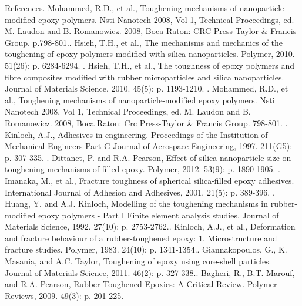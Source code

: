 \documentclass[numbers=noendperiod,chapterprefix=on]{icldt} %
\begin{document}

References.	Mohammed, R.D., et al., Toughening mechanisms of nanoparticle-modified epoxy polymers. Nsti Nanotech 2008, Vol 1, Technical Proceedings, ed. M. Laudon and B. Romanowicz. 2008, Boca Raton: CRC Press-Taylor \& Francis Group. p.798-801..	Hsieh, T.H., et al., The mechanisms and mechanics of the toughening of epoxy polymers modified with silica nanoparticles. Polymer, 2010. 51(26): p. 6284-6294.
.	Hsieh, T.H., et al., The toughness of epoxy polymers and fibre composites modified with rubber microparticles and silica nanoparticles. Journal of Materials Science, 2010. 45(5): p. 1193-1210.
.	Mohammed, R.D., et al., Toughening mechanisms of nanoparticle-modified epoxy polymers. Nsti Nanotech 2008, Vol 1, Technical Proceedings, ed. M. Laudon and B. Romanowicz. 2008, Boca Raton: Crc Press-Taylor \& Francis Group. 798-801.
.	Kinloch, A.J., Adhesives in engineering. Proceedings of the Institution of Mechanical Engineers Part G-Journal of Aerospace Engineering, 1997. 211(G5): p. 307-335.
.	Dittanet, P. and R.A. Pearson, Effect of silica nanoparticle size on toughening mechanisms of filled epoxy. Polymer, 2012. 53(9): p. 1890-1905.
.	Imanaka, M., et al., Fracture toughness of spherical silica-filled epoxy adhesives. International Journal of Adhesion and Adhesives, 2001. 21(5): p. 389-396.
.	Huang, Y. and A.J. Kinloch, Modelling of the toughening mechanisms in rubber-modified epoxy polymers - Part I Finite element analysis studies. Journal of Materials Science, 1992. 27(10): p. 2753-2762..	Kinloch, A.J., et al., Deformation and fracture behaviour of a rubber-toughened epoxy: 1. Microstructure and fracture studies. Polymer, 1983. 24(10): p. 1341-1354..	Giannakopoulos, G., K. Masania, and A.C. Taylor, Toughening of epoxy using core-shell particles. Journal of Materials Science, 2011. 46(2): p. 327-338..	Bagheri, R., B.T. Marouf, and R.A. Pearson, Rubber-Toughened Epoxies: A Critical Review. Polymer Reviews, 2009. 49(3): p. 201-225.\newline
\end{document}
